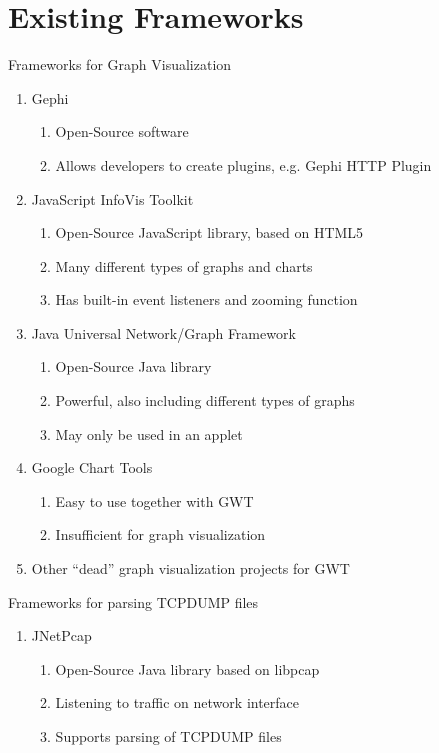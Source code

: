 \documentclass{beamer}
\begin{document}
\section{Existing Frameworks}

\begin{frame}{Frameworks for Graph Visualization}

  \begin{enumerate}
    \item Gephi \cite{Gephi}
      \begin{enumerate}
	\item Open-Source software
	\item Allows developers to create plugins, e.g. Gephi HTTP Plugin
      \end{enumerate}
    \item JavaScript InfoVis Toolkit \cite{INVOVIS}
      \begin{enumerate}
	\item Open-Source JavaScript library, based on HTML5
	\item Many different types of graphs and charts
	\item Has built-in event listeners and zooming function
      \end{enumerate}
    \item Java Universal Network/Graph Framework \cite{JUNG}
      \begin{enumerate}
	\item Open-Source Java library
	\item Powerful, also including different types of graphs
	\item May only be used in an applet
      \end{enumerate}
    \item Google Chart Tools \cite{GoogleChart}
      \begin{enumerate}
	\item Easy to use together with GWT \cite{GWT}
	\item Insufficient for graph visualization
      \end{enumerate}
     \item Other ``dead'' graph visualization projects for GWT
 \end{enumerate}
\end{frame}

\begin{frame}{Frameworks for parsing TCPDUMP files }
  \begin{enumerate}
   \item JNetPcap \cite{JNETPCAP}
      \begin{enumerate}
	\item Open-Source Java library based on libpcap
	\item Listening to traffic on network interface
	\item Supports parsing of TCPDUMP files
      \end{enumerate}  
  \end{enumerate}
\end{frame}
\end{document}
